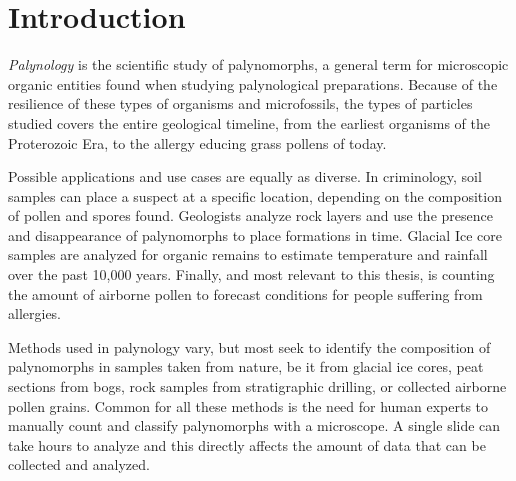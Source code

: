 \chapter{Introduction}\label{cha:Introduction}


\textit{Palynology} is the scientific study of palynomorphs, a general term for microscopic organic entities found when studying palynological preparations.
Because of the resilience of these types of organisms and microfossils, the types of particles studied covers the entire geological timeline, from the earliest organisms of the Proterozoic Era, to the allergy educing grass pollens of today.

Possible applications and use cases are equally as diverse.
In criminology, soil samples can place a suspect at a specific location, depending on the composition of pollen and spores found.
Geologists analyze rock layers and use the presence and disappearance of palynomorphs to place formations in time.
Glacial Ice core samples are analyzed for organic remains to estimate temperature and rainfall over the past 10,000 years.
Finally, and most relevant to this thesis, is counting the amount of airborne pollen to forecast conditions for people suffering from allergies.

Methods used in palynology vary, but most seek to identify the composition of palynomorphs in samples taken from nature, be it from glacial ice cores, peat sections from bogs, rock samples from stratigraphic drilling, or collected airborne pollen grains.
Common for all these methods is the need for human experts to manually count and classify palynomorphs with a microscope.
A single slide can take hours to analyze and this directly affects the amount of data that can be collected and analyzed.

